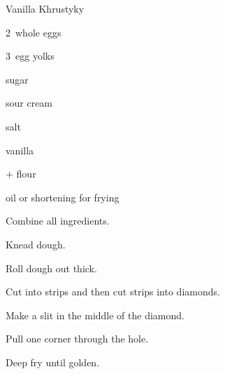 \begin{recipe}{Vanilla Khrustyky}{}{}

\begin{ingredients}
\item 2~whole eggs
\item 3~egg yolks
\item {} sugar
\item {} sour cream
\item \tp{\half} salt
\item {} vanilla
\item {}$+$ flour
\item oil or shortening for frying
\end{ingredients}

\begin{directions}
\item Combine all ingredients.
\item Knead dough.
\item Roll dough out \inch{\eighth} thick.
\item Cut into strips and then cut strips into diamonds.
\item Make a slit in the middle of the diamond.
\item Pull one corner through the hole.
\item Deep fry until golden.
\end{directions}

\end{recipe}
